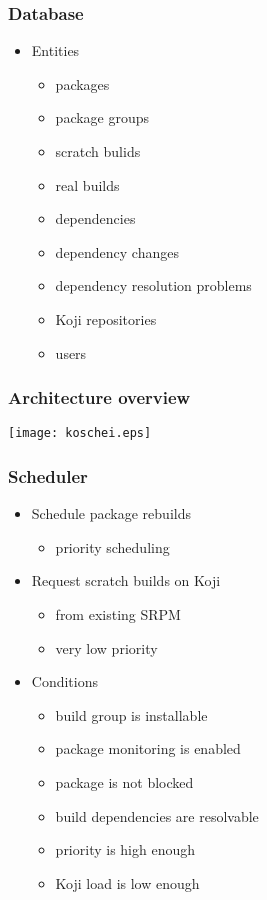 \documentclass[pdftex,unicode,xcolor=table]{beamer}
\begin{document}
\begin{frame}
  \frametitle{Database}
  \begin{itemize}
    \item Entities
    \begin{itemize}
      \item packages
      \item package groups
      \item scratch bulids
      \item real builds
      \item dependencies
      \item dependency changes
      \item dependency resolution problems
      \item Koji repositories
      \item users
    \end{itemize}
  \end{itemize}
\end{frame}

\begin{frame}[fragile]
  \frametitle{Architecture overview}
  \begin{center}
    \texttt{[image: koschei.eps]}
  \end{center}
\end{frame}

\begin{frame}
  \frametitle{Scheduler}
  \begin{itemize}
    \item Schedule package rebuilds
    \begin{itemize}
      \item priority scheduling
    \end{itemize}
    \item Request scratch builds on Koji
    \begin{itemize}
      \item from existing SRPM
      \item very low priority
    \end{itemize}
    \item Conditions
    \begin{itemize}
      \item build group is installable
      \item package monitoring is enabled
      \item package is not blocked
      \item build dependencies are resolvable
      \item priority is high enough
      \item Koji load is low enough
    \end{itemize}
  \end{itemize}
\end{frame}
\end{document}

